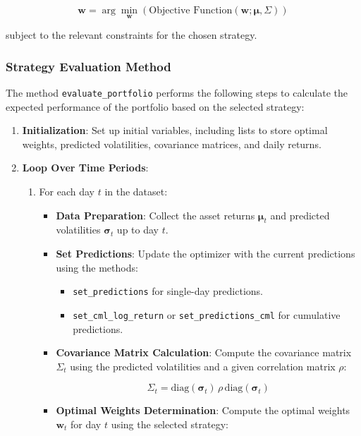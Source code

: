 \[
\mathbf{w} = \arg\min_{\mathbf{w}} \left( \text{Objective Function}(\mathbf{w}; \boldsymbol{\mu}, \Sigma) \right)
\]

subject to the relevant constraints for the chosen strategy.

\subsubsection{Strategy Evaluation Method}

The method \texttt{evaluate\_portfolio} performs the following steps to calculate the expected performance of the portfolio based on the selected strategy:

\begin{enumerate}
    \item \textbf{Initialization}: Set up initial variables, including lists to store optimal weights, predicted volatilities, covariance matrices, and daily returns.
    \item \textbf{Loop Over Time Periods}:
    \begin{enumerate}
        \item For each day \( t \) in the dataset:
        \begin{itemize}
            \item \textbf{Data Preparation}: Collect the asset returns \( \boldsymbol{\mu}_t \) and predicted volatilities \( \boldsymbol{\sigma}_t \) up to day \( t \).
            \item \textbf{Set Predictions}: Update the optimizer with the current predictions using the methods:
            \begin{itemize}
                \item \texttt{set\_predictions} for single-day predictions.
                \item \texttt{set\_cml\_log\_return} or \texttt{set\_predictions\_cml} for cumulative predictions.
            \end{itemize}
            \item \textbf{Covariance Matrix Calculation}: Compute the covariance matrix \( \Sigma_t \) using the predicted volatilities and a given correlation matrix \( \rho \):

            \[
            \Sigma_t = \text{diag}(\boldsymbol{\sigma}_t) \, \rho \, \text{diag}(\boldsymbol{\sigma}_t)
            \]

            \item \textbf{Optimal Weights Determination}: Compute the optimal weights \( \mathbf{w}_t \) for day \( t \) using the selected strategy:


\end{itemize}
\end{enumerate}
\end{enumerate}
